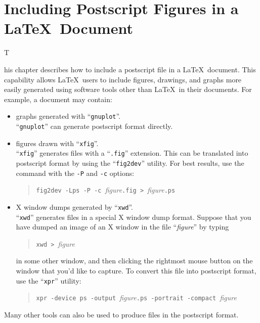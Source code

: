 \chapter{Including Postscript Figures in a \LaTeX\  Document}

\centerline[This chapter is contributed by Joan Carletta]

This chapter describes how to include a postscript file in a \LaTeX\
document. This capability allows \LaTeX\ users to include figures,
drawings, and graphs more easily generated using software tools other
than \LaTeX\ in their documents. For example, a document may contain:
\begin {itemize}
  \item graphs generated with ``\verb+gnuplot+''.\\
        ``\verb+gnuplot+'' can generate postscript format directly.
  \item figures drawn with ``\verb+xfig+''.\\
        ``\verb+xfig+'' generates files with a ``\verb+.fig+'' extension.  
        This can be translated into postscript format by using
        the ``\verb+fig2dev+'' utility.  For best results, use the
        command with the \verb+-P+ and \verb+-c+ options:
        \begin {quotation}
          \verb+fig2dev -Lps -P -c +{\em figure}\verb+.fig > +{\em figure}\verb+.ps+
        \end {quotation}
  \item X window dumps generated by ``\verb+xwd+''.\\
        ``\verb+xwd+'' generates files in a special X window dump
        format.  Suppose that you have dumped an image of an X window 
        in the file ``{\em figure}'' by typing 
        \begin {quotation}
          \verb+xwd > +{\em figure}
        \end {quotation}
        in some other window, and then clicking the rightmost mouse
        button on the window that you'd like to capture.
        To convert this file into postscript format, use the
        ``\verb+xpr+'' utility:
        \begin {quotation}
          \verb+xpr -device ps -output +{\em figure}\verb+.ps -portrait -compact +{\em figure}
        \end {quotation}
\end {itemize}
Many other tools can also be used to produce files in the postscript
format.

